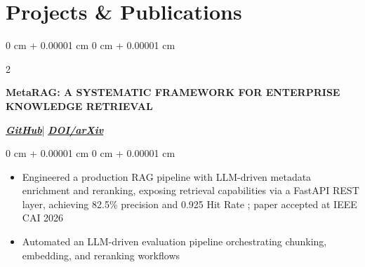 \documentclass[10pt, letterpaper]{article}
\newenvironment{highlights}{
    \begin{itemize}[
        topsep=0.10 cm,
        parsep=0.10 cm,
        partopsep=0pt,
        itemsep=0pt,
        leftmargin=0 cm + 10pt
    ]
}{
    \end{itemize}
} %
\newenvironment{onecolentry}{
    \begin{adjustwidth}{
        0 cm + 0.00001 cm
    }{
        0 cm + 0.00001 cm
    }
}{
    \end{adjustwidth}
} %
\newenvironment{twocolentry}[2][]{
    \onecolentry
    \def\secondColumn{#2}
    \setcolumnwidth{\fill, 4.5 cm}
    \begin{paracol}{2}
}{
    \switchcolumn \raggedleft \secondColumn
    \end{paracol}
    \endonecolentry
} %
\begin{document}
\section{Projects \& Publications}


\begin{twocolentry}{
           \href{https://github.com/PranavMishra17/Metadata-Enrichment-with-LLMs-for-RAGs-Internal-Knowledge-Retrieval}{\textbf{\textit{GitHub}}}| \href{https://doi.org/10.48550/arXiv.2512.05411}{\textbf{\textit{DOI/arXiv}}}
       }
           \textbf{MetaRAG: A SYSTEMATIC FRAMEWORK FOR ENTERPRISE KNOWLEDGE RETRIEVAL}
\end{twocolentry}
\begin{onecolentry}
    \begin{highlights}
\item Engineered a production RAG pipeline with LLM-driven metadata enrichment and reranking, exposing retrieval capabilities via a FastAPI REST layer, achieving 82.5\% precision and 0.925 Hit Rate ; paper accepted at IEEE CAI 2026
\item Automated an LLM-driven evaluation pipeline orchestrating chunking, embedding, and reranking workflows
    \end{highlights}

\end{onecolentry}

\vspace{0.15 cm}
\end{document}
